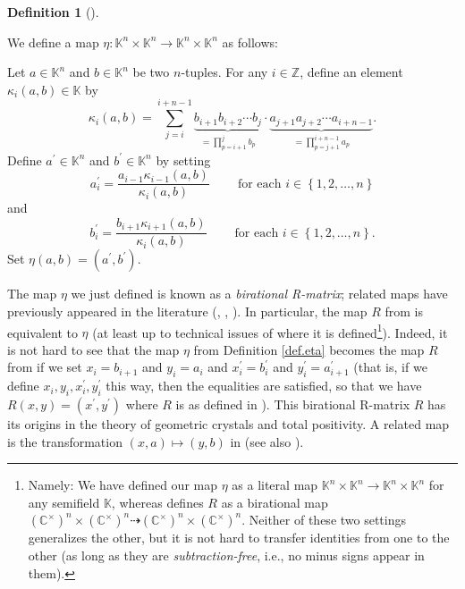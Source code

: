 \documentclass[numbers=enddot,12pt,final,onecolumn,notitlepage]{scrartcl}%
\theoremstyle{definition}
\newtheorem{defi}[theo]{Definition}
\newenvironment{definition}[1][]
{\begin{defi}[#1]\begin{leftbar}}
{\end{leftbar}\end{defi}}
\let\sumnonlimits\sum
\let\prodnonlimits\prod
\renewcommand{\sum}{\sumnonlimits\limits}
\renewcommand{\prod}{\prodnonlimits\limits}
\begin{document}
\begin{definition}
\label{def.eta}We define a map $\eta:\mathbb{K}^{n}\times\mathbb{K}%
^{n}\rightarrow\mathbb{K}^{n}\times\mathbb{K}^{n}$ as follows:

Let $a\in\mathbb{K}^{n}$ and $b\in\mathbb{K}^{n}$ be two $n$-tuples. For any
$i\in\mathbb{Z}$, define an element $\kappa_{i}\left(  a,b\right)
\in\mathbb{K}$ by%
\[
\kappa_{i}\left(  a,b\right)  =\sum_{j=i}^{i+n-1}\underbrace{b_{i+1}%
b_{i+2}\cdots b_{j}}_{=\prod_{p=i+1}^{j}b_{p}}\cdot\underbrace{a_{j+1}%
a_{j+2}\cdots a_{i+n-1}}_{=\prod_{p=j+1}^{i+n-1}a_{p}}.
\]
Define $a^{\prime}\in\mathbb{K}^{n}$ and $b^{\prime}\in\mathbb{K}^{n}$ by
setting%
\[
a_{i}^{\prime}=\dfrac{a_{i-1}\kappa_{i-1}\left(  a,b\right)  }{\kappa
_{i}\left(  a,b\right)  }\ \ \ \ \ \ \ \ \ \ \text{for each }i\in\left\{
1,2,\ldots,n\right\}
\]
and%
\[
b_{i}^{\prime}=\dfrac{b_{i+1}\kappa_{i+1}\left(  a,b\right)  }{\kappa
_{i}\left(  a,b\right)  }\ \ \ \ \ \ \ \ \ \ \text{for each }i\in\left\{
1,2,\ldots,n\right\}  .
\]
Set $\eta\left(  a,b\right)  =\left(  a^{\prime},b^{\prime}\right)  $.
\end{definition}

The map $\eta$ we just defined is known as a \textit{birational R-matrix};
related maps have previously appeared in the literature (\cite[Lemma
8.6]{BraKaz00}, \cite[Definition 2.1]{Yamada01}, \cite[Proposition
3.1]{Etingo03}). In particular, the map $R$ from \cite[Proposition
3.1]{Etingo03} is equivalent to $\eta$ (at least up to technical issues of
where it is defined\footnote{Namely: We have defined our map $\eta$ as a
literal map $\mathbb{K}^{n}\times\mathbb{K}^{n}\rightarrow\mathbb{K}^{n}%
\times\mathbb{K}^{n}$ for any semifield $\mathbb{K}$, whereas
\cite[Proposition 3.1]{Etingo03} defines $R$ as a birational map $\left(
\mathbb{C}^{\times}\right)  ^{n}\times\left(  \mathbb{C}^{\times}\right)
^{n}\dashrightarrow\left(  \mathbb{C}^{\times}\right)  ^{n}\times\left(
\mathbb{C}^{\times}\right)  ^{n}$. Neither of these two settings generalizes
the other, but it is not hard to transfer identities from one to the other (as
long as they are \textit{subtraction-free}, i.e., no minus signs appear in
them).}). Indeed, it is not hard to see that the map $\eta$ from Definition
\ref{def.eta} becomes the map $R$ from \cite[Proposition 3.1]{Etingo03} if we
set $x_{i}=b_{i+1}$ and $y_{i}=a_{i}$ and $x_{i}^{\prime}=b_{i}^{\prime}$ and
$y_{i}^{\prime}=a_{i+1}^{\prime}$ (that is, if we define $x_{i},y_{i}%
,x_{i}^{\prime},y_{i}^{\prime}$ this way, then the equalities \cite[(8), (9)
and (10)]{Etingo03} are satisfied, so that we have $R\left(  x,y\right)
=\left(  x^{\prime},y^{\prime}\right)  $ where $R$ is as defined in
\cite[Proposition 3.1]{Etingo03}). This birational R-matrix $R$ has its
origins in the theory of geometric crystals and total positivity. A related
map is the transformation $\left(  x,a\right)  \mapsto\left(  y,b\right)  $ in
\cite[\S 2.2]{NoumiYamada} (see also \cite{Zygour18}).
\end{document}
